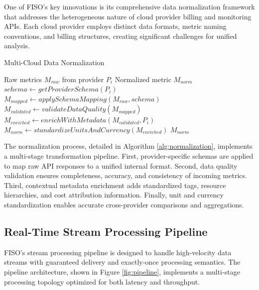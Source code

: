 \documentclass[conference]{IEEEtran}
\begin{document}
One of FISO's key innovations is its comprehensive data normalization framework that addresses the heterogeneous nature of cloud provider billing and monitoring APIs. Each cloud provider employs distinct data formats, metric naming conventions, and billing structures, creating significant challenges for unified analysis.

\begin{algorithm}
\caption{Multi-Cloud Data Normalization}
\label{alg:normalization}
\begin{algorithmic}[1]
\REQUIRE Raw metrics $M_{raw}$ from provider $P_i$
\ENSURE Normalized metric $M_{norm}$
\STATE $schema \leftarrow getProviderSchema(P_i)$
\STATE $M_{mapped} \leftarrow applySchemaMapping(M_{raw}, schema)$
\STATE $M_{validated} \leftarrow validateDataQuality(M_{mapped})$
\STATE $M_{enriched} \leftarrow enrichWithMetadata(M_{validated}, P_i)$
\STATE $M_{norm} \leftarrow standardizeUnitsAndCurrency(M_{enriched})$
\RETURN $M_{norm}$
\end{algorithmic}
\end{algorithm}

The normalization process, detailed in Algorithm \ref{alg:normalization}, implements a multi-stage transformation pipeline. First, provider-specific schemas are applied to map raw API responses to a unified internal format. Second, data quality validation ensures completeness, accuracy, and consistency of incoming metrics. Third, contextual metadata enrichment adds standardized tags, resource hierarchies, and cost attribution information. Finally, unit and currency standardization enables accurate cross-provider comparisons and aggregations.

\subsection{Real-Time Stream Processing Pipeline}

FISO's stream processing pipeline is designed to handle high-velocity data streams with guaranteed delivery and exactly-once processing semantics. The pipeline architecture, shown in Figure \ref{fig:pipeline}, implements a multi-stage processing topology optimized for both latency and throughput.
\end{document}
